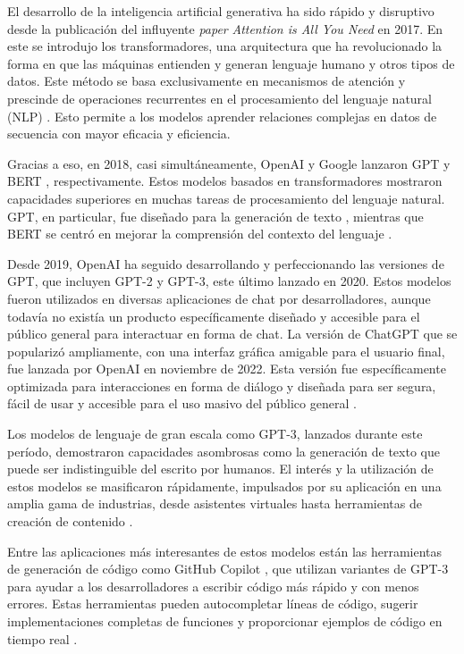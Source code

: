 El desarrollo de la inteligencia artificial generativa ha sido rápido y disruptivo desde la publicación del influyente \textit{paper} \textit{Attention is All You Need} \citep{Vaswani2017} en 2017. En este se introdujo los transformadores, una arquitectura que ha revolucionado la forma en que las máquinas entienden y generan lenguaje humano y otros tipos de datos. Este método se basa exclusivamente en mecanismos de atención y prescinde de operaciones recurrentes en el procesamiento del lenguaje natural (NLP) \citep{Vaswani2017}. Esto permite a los modelos aprender relaciones complejas en datos de secuencia con mayor eficacia y eficiencia.

Gracias a eso, en 2018, casi simultáneamente, OpenAI y Google lanzaron GPT \citep{Radford2018} y BERT \citep{Devlin2018}, respectivamente. Estos modelos basados en transformadores mostraron capacidades superiores en muchas tareas de procesamiento del lenguaje natural. GPT, en particular, fue diseñado para la generación de texto \citep{Radford2018}, mientras que BERT se centró en mejorar la comprensión del contexto del lenguaje \citep{Devlin2018}.

Desde 2019, OpenAI ha seguido desarrollando y perfeccionando las versiones de GPT, que incluyen GPT-2 y GPT-3, este último lanzado en 2020. Estos modelos fueron utilizados en diversas aplicaciones de chat por desarrolladores, aunque todavía no existía un producto específicamente diseñado y accesible para el público general para interactuar en forma de chat. La versión de ChatGPT que se popularizó ampliamente, con una interfaz gráfica amigable para el usuario final, fue lanzada por OpenAI en noviembre de 2022. Esta versión fue específicamente optimizada para interacciones en forma de diálogo y diseñada para ser segura, fácil de usar y accesible para el uso masivo del público general \citep{OpenAI2022ChatGPT}.

Los modelos de lenguaje de gran escala como GPT-3, lanzados durante este período, demostraron capacidades asombrosas como la generación de texto que puede ser indistinguible del escrito por humanos. El interés y la utilización de estos modelos se masificaron rápidamente, impulsados por su aplicación en una amplia gama de industrias, desde asistentes virtuales hasta herramientas de creación de contenido \citep{V7Labs2023}.

Entre las aplicaciones más interesantes de estos modelos están las herramientas de generación de código como GitHub Copilot \citep{GitHubCopilot2023}, que utilizan variantes de GPT-3 para ayudar a los desarrolladores a escribir código más rápido y con menos errores. Estas herramientas pueden autocompletar líneas de código, sugerir implementaciones completas de funciones y proporcionar ejemplos de código en tiempo real \citep{GitHubCopilot2023}. 

